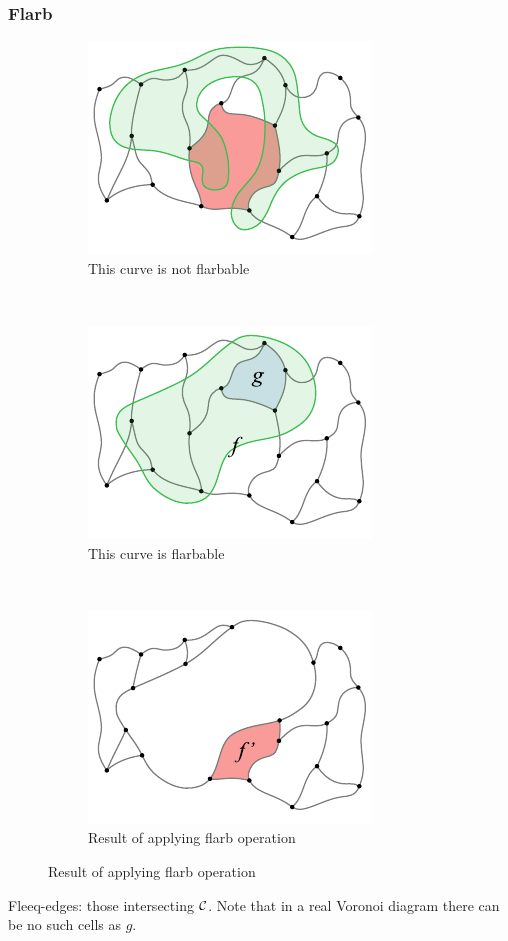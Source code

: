 \begin{frame} \frametitle{Flarb}
\begin{figure}[h] \centering
	\begin{subfigure}[t]{0.31\textwidth}
	\centering
	\includegraphics[scale=0.92]{flarb/1notflarb}
	\caption{This curve is not flarbable}
	\end{subfigure}
~
	\begin{subfigure}[t]{0.31\textwidth}
	\centering
	\includegraphics[scale=0.92]{flarb/2flarb}
	\caption{This curve is flarbable}
	\end{subfigure}
~
	\begin{subfigure}[t]{0.31\textwidth}
	\centering
	\includegraphics[scale=0.92]{flarb/3afterflarb}
	\caption{Result of applying flarb operation}
	\end{subfigure}
\end{figure} \medskip

Fleeq-edges:  those intersecting $\mathcal C$. Note that in a real Voronoi diagram there can be no such cells as $g$.
\end{frame}